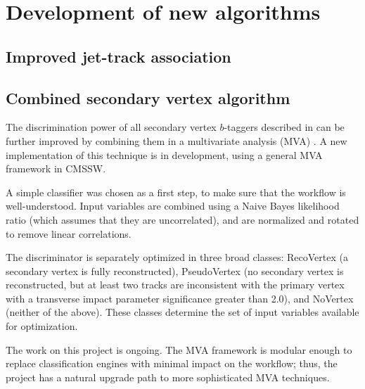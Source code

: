 \section{Development of new algorithms \label{sec:dvelopments}}

\subsection{Improved jet-track association}

\subsection{Combined secondary vertex algorithm}

The discrimination power of all secondary vertex $b$-taggers described
in \cite{btaggingPAS2009} can be further improved by combining them in
a multivariate analysis (MVA) \cite{Weiser:2006md}.  A new
implementation of this technique is in development, using a general
MVA framework in CMSSW.

A simple classifier was chosen as a first step, to make sure that the
workflow is well-understood.  Input variables are combined using a Naive
Bayes likelihood ratio (which assumes that they are uncorrelated), and
are normalized and rotated to remove linear correlations.

The discriminator is separately optimized in three broad classes: RecoVertex (a
secondary vertex is fully reconstructed), PseudoVertex (no secondary
vertex is reconstructed, but at least two tracks are inconsistent with
the primary vertex with a transverse impact parameter significance
greater than 2.0), and NoVertex (neither of the above).  These classes
determine the set of input variables available for optimization.

The work on this project is ongoing.  The MVA framework is modular
enough to replace classification engines with minimal impact on the
workflow; thus, the project has a natural upgrade path to more
sophisticated MVA techniques.
